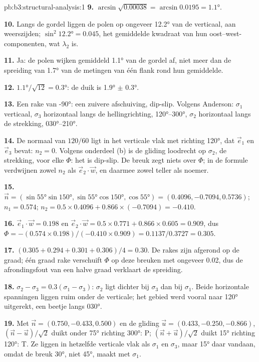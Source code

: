 \begin{solution}{pb:b3:structural-analysis:1}
\textbf{9.} $\arcsin\sqrt{0.00038} = \arcsin0.0195 = \ang{1.1}$.

\textbf{10.} Langs de gordel liggen de polen op ongeveer \ang{12.2} van de verticaal,
aan weerszijden; $\sin^2\ang{12.2} = 0.045$, het gemiddelde kwadraat van hun
oost--west-componenten, wat $\lambda_2$ is.

\textbf{11.} Ja: de polen wijken gemiddeld \ang{1.1} van de gordel af, niet
meer dan de spreiding van \ang{1.7} van de metingen van één flank rond hun gemiddelde.

\textbf{12.} $\ang{1.1}/\sqrt{12} = \ang{0.3}$: de duik is \ang{1.9} $\pm$
\ang{0.3}.

\textbf{13.} Een rake van \ang{-90}: een zuivere afschuiving, dip-slip. Volgens Anderson:
$\sigma_1$ verticaal, $\sigma_3$ horizontaal langs de hellingrichting,
\ang{120}--\ang{300}, $\sigma_2$ horizontaal langs de strekking,
\ang{030}--\ang{210}.

\textbf{14.} De normaal van $120/60$ ligt in het verticale vlak met richting
\ang{120}, dat $\vec e_1$ en $\vec e_3$ bevat: $n_2 = 0$. Volgens onderdeel (b) is de
gliding loodrecht op $\sigma_2$, de strekking, voor elke $\Phi$: het is
dip-slip. De breuk zegt niets over $\Phi$; in de formule verdwijnen zowel $n_2$ als
$\vec e_2\cdot\vec w$, en daarmee zowel teller als noemer.

\textbf{15.} $\vec n = (\sin\ang{55}\sin\ang{150}, \sin\ang{55}\cos\ang{150},
\cos\ang{55}) = (0.4096, -0.7094, 0.5736)$; $n_1 = 0.574$; $n_2 = 0.5\times
0.4096 + 0.866\times(-0.7094) = -0.410$.

\textbf{16.} $\vec e_1\cdot\vec w = 0.198$ en $\vec e_2\cdot\vec w = 0.5\times
0.771 + 0.866\times0.605 = 0.909$, dus $\Phi = -(0.574\times0.198)/(-0.410\times
0.909) = 0.1137/0.3727 = 0.305$.

\textbf{17.} $(0.305 + 0.294 + 0.301 + 0.306)/4 = 0.30$. De rakes zijn
afgerond op de graad; één graad rake verschuift $\Phi$ op deze breuken met ongeveer 0.02,
dus de afrondingsfout van een halve graad verklaart de spreiding.

\textbf{18.} $\sigma_2 - \sigma_3 = 0.3(\sigma_1 - \sigma_3)$: $\sigma_2$ ligt
dichter bij $\sigma_3$ dan bij $\sigma_1$. Beide horizontale spanningen liggen ruim
onder de verticale; het gebied werd vooral naar \ang{120} uitgerekt, een
beetje langs \ang{030}.

\textbf{19.} Met $\vec n = (0.750, -0.433, 0.500)$ en de gliding $\vec u =
(0.433, -0.250, -0.866)$, $(\vec n - \vec u)/\sqrt2$ duikt onder \ang{75} richting
\ang{300}: P; $(\vec n + \vec u)/\sqrt2$ duikt \ang{15} richting \ang{120}:
T. Ze liggen in hetzelfde verticale vlak als $\sigma_1$ en $\sigma_3$, maar
\ang{15} daar vandaan, omdat de breuk \ang{30}, niet \ang{45}, maakt met
$\sigma_1$.


\end{solution}
